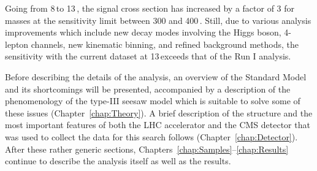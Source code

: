 Going from 8\,\TeV to 13\,\TeV, the signal cross section has increased by a factor of 3 for masses at the sensitivity limit between 300 and 400\,\GeV. Still, due to various analysis improvements which include new decay modes involving the Higgs boson, 4-lepton channels, new kinematic binning, and refined background methods, the sensitivity with the current \fullLumi dataset at 13\,\TeV exceeds that of the Run I analysis.


Before describing the details of the analysis, an overview of the Standard Model and its shortcomings will be presented, accompanied by a description of the phenomenology of the type-III seesaw model which is suitable to solve some of these issues (Chapter~\ref{chap:Theory}). A brief description of the structure and the most important features of both the LHC accelerator and the CMS detector that was used to collect the data for this search follows (Chapter~\ref{chap:Detector}). After these rather generic sections, Chapters~\ref{chap:Samples}--\ref{chap:Results} continue to describe the analysis itself as well as the results.
